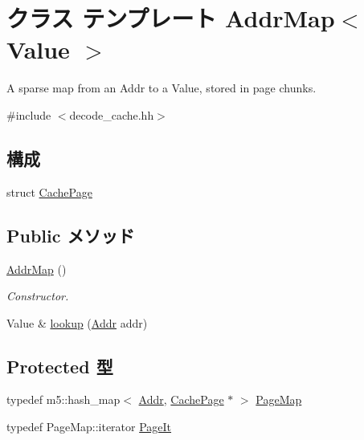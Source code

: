 \hypertarget{classDecodeCache_1_1AddrMap}{
\section{クラス テンプレート AddrMap$<$ Value $>$}
\label{classDecodeCache_1_1AddrMap}
}


A sparse map from an Addr to a Value, stored in page chunks.  


{\ttfamily \#include $<$decode\_\-cache.hh$>$}\subsection*{構成}
\begin{DoxyCompactItemize}
\item 
struct \hyperlink{structDecodeCache_1_1AddrMap_1_1CachePage}{CachePage}
\end{DoxyCompactItemize}
\subsection*{Public メソッド}
\begin{DoxyCompactItemize}
\item 
\hyperlink{classDecodeCache_1_1AddrMap_a3214943b0a8ea1081d074586e075edde}{AddrMap} ()
\begin{DoxyCompactList}\small\item\em Constructor. \item\end{DoxyCompactList}\item 
Value \& \hyperlink{classDecodeCache_1_1AddrMap_a758c7479d2ee5aa3d4f1e7584d30379a}{lookup} (\hyperlink{base_2types_8hh_af1bb03d6a4ee096394a6749f0a169232}{Addr} addr)
\end{DoxyCompactItemize}
\subsection*{Protected 型}
\begin{DoxyCompactItemize}
\item 
typedef m5::hash\_\-map$<$ \hyperlink{base_2types_8hh_af1bb03d6a4ee096394a6749f0a169232}{Addr}, \hyperlink{structDecodeCache_1_1AddrMap_1_1CachePage}{CachePage} $\ast$ $>$ \hyperlink{classDecodeCache_1_1AddrMap_a975f1d72d35f5fb84de6f419b04bf347}{PageMap}
\item 
typedef PageMap::iterator \hyperlink{classDecodeCache_1_1AddrMap_af0021638c8ab5f47787c8c1973a125b8}{PageIt}
\end{DoxyCompactItemize}
